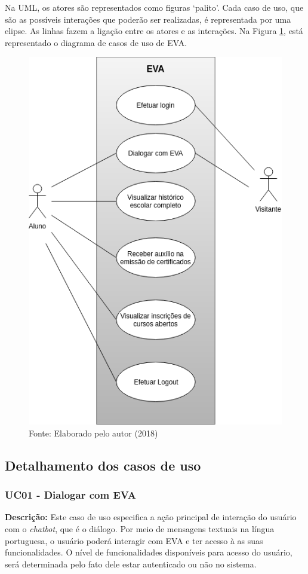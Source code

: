 Na UML, os atores são representados como figuras ‘palito’. Cada caso de uso, que são as possíveis interações que poderão ser realizadas, é representada por uma elipse. As linhas fazem a ligação entre os atores e as interações. Na Figura \ref{cap:03:fig:diagrama}, está representado o diagrama de casos de uso de EVA.
\begin{figure}
    \centering
    \includegraphics[width=0.3\linewidth]{src/imagens/CasoDeUsoEva.png}
    \caption{Fonte: Elaborado pelo autor (2018)}
    \label{cap:03:fig:diagrama}
\end{figure}

\subsection{Detalhamento dos casos de uso}

\subsubsection{UC01 - Dialogar com EVA}
\textbf{Descrição:} Este caso de uso especifica a ação principal de interação do usuário com o \textit{chatbot}, que é o diálogo. Por meio de mensagens textuais na língua portuguesa, o usuário poderá interagir com EVA e ter acesso à as suas funcionalidades. O nível de funcionalidades disponíveis para acesso do usuário, será determinada pelo fato dele estar autenticado ou não no sistema.

